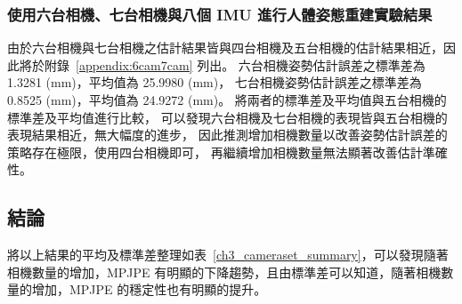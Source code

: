 \subsubsection{使用六台相機、七台相機與八個 IMU 進行人體姿態重建實驗結果}
由於六台相機與七台相機之估計結果皆與四台相機及五台相機的估計結果相近，因此將於附錄~\ref{appendix:6cam7cam} 列出。
六台相機姿勢估計誤差之標準差為 1.3281 (mm)，平均值為 25.9980 (mm)，
七台相機姿勢估計誤差之標準差為 0.8525 (mm)，平均值為 24.9272 (mm)。
將兩者的標準差及平均值與五台相機的標準差及平均值進行比較，
可以發現六台相機及七台相機的表現皆與五台相機的表現結果相近，無大幅度的進步，
因此推測增加相機數量以改善姿勢估計誤差的策略存在極限，使用四台相機即可，
再繼續增加相機數量無法顯著改善估計準確性。

\subsection{結論}
將以上結果的平均及標準差整理如表~\ref{ch3_cameraset_summary}，可以發現隨著相機數量的增加，MPJPE 有明顯的下降趨勢，且由標準差可以知道，隨著相機數量的增加，MPJPE 的穩定性也有明顯的提升。

\begin{table}[ht]
   \caption{不同相機數量的平均及標準差}
   \label{ch3_cameraset_summary}
   \setlength{\tabcolsep}{3pt}
   \renewcommand\arraystretch{1.5}
\end{table}

